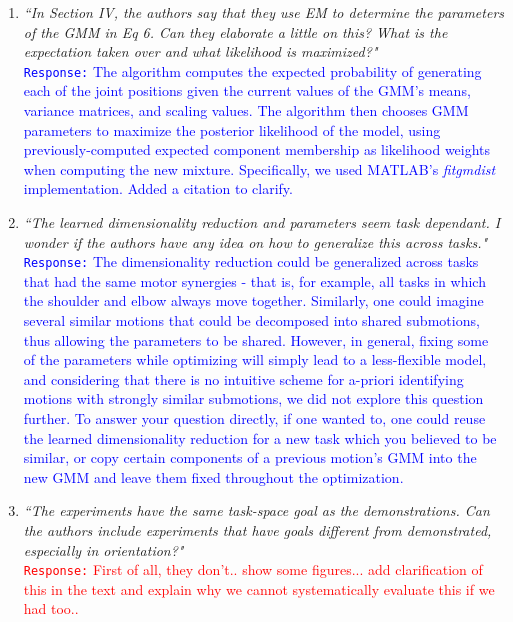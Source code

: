 \documentclass[10pt,stdletter,dateno]{newlfm}
\begin{document}
\begin{newlfm}
\begin{enumerate}
\item \textit{``In Section IV, the authors say that they use EM to determine the parameters of the GMM in Eq 6. Can
they elaborate a little on this? What is the expectation taken over and what likelihood is maximized?"}\\
\textcolor{blue}{\texttt{Response:} \small The algorithm computes the expected probability of generating each of the joint positions given the current values of the GMM's means, variance matrices, and scaling values. The algorithm then chooses GMM parameters to maximize the posterior likelihood of the model, using previously-computed expected component membership as likelihood weights when computing the new mixture. Specifically, we used MATLAB's \textit{fitgmdist} implementation. Added a citation to clarify.}\\

\item \textit{``The learned dimensionality reduction and parameters seem task dependant. I wonder if the authors
have any idea on how to generalize this across tasks."}\\
\textcolor{blue}{\texttt{Response:} \small The dimensionality reduction could be generalized across tasks that had the same motor synergies - that is, for example, all tasks in which the shoulder and elbow always move together. Similarly, one could imagine several similar motions that could be decomposed into shared submotions, thus allowing the parameters to be shared. However, in general, fixing some of the parameters while optimizing will simply lead to a less-flexible model, and considering that there is no intuitive scheme for a-priori identifying motions with strongly similar submotions, we did not explore this question further. To answer your question directly, if one wanted to, one could reuse the learned dimensionality reduction for a new task which you believed to be similar, or copy certain components of a previous motion's GMM into the new GMM and leave them fixed throughout the optimization.}\\

\item \textit{``The experiments have the same task-space goal as the
demonstrations. Can the authors include experiments that have goals
different from demonstrated, especially in orientation?"}\\
\textcolor{red}{\texttt{Response:} \small First of all, they don't.. show some figures... add clarification of this in the text and explain why we cannot systematically evaluate this if we had too..}\\


\end{enumerate}
\end{newlfm}
\end{document}
